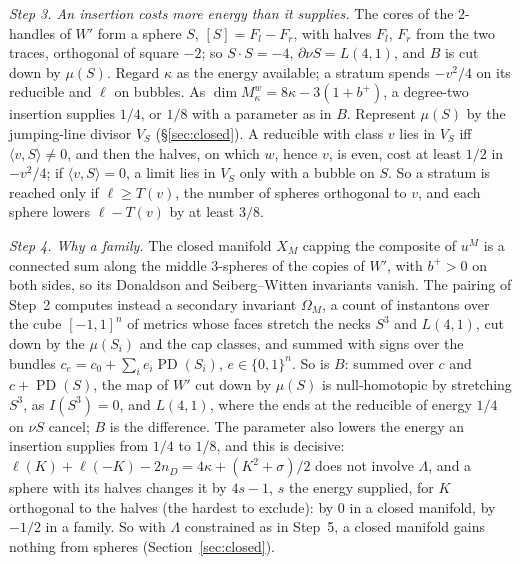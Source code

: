 \documentclass[10pt]{amsart}
\numberwithin{equation}{section}
\theoremstyle{compact}
\newcommand{\PD}{\operatorname{PD}}
\newcommand{\step}[1]{\par\noindent\textit{#1}\enspace}
\begin{document}
\step{Step 3. An insertion costs more energy than it supplies.}
The cores of the $2$-handles of $W'$ form a sphere $S$, $[S]=F_l-F_r$,
with halves $F_l$, $F_r$ from the two traces, orthogonal of square $-2$; so
$S\cdot S=-4$, $\partial\nu S=L(4,1)$, and $B$ is cut down by $\mu(S)$. Regard
$\kappa$ as the energy available; a stratum spends $-v^2/4$ on its
reducible and $\ell$ on bubbles. As
$\dim M^w_\kappa=8\kappa-3(1+b^+)$, a degree-two insertion supplies $1/4$, or
$1/8$ with a parameter as in $B$. Represent $\mu(S)$ by the
jumping-line divisor $V_S$ (\S\ref{sec:closed}). A reducible with class
$v$ lies in $V_S$ iff $\langle v,S\rangle\neq0$, and then the halves,
on which $w$, hence $v$, is even, cost at least $1/2$ in $-v^2/4$; if
$\langle v,S\rangle=0$, a limit lies in $V_S$ only with a bubble on $S$. So a
stratum is reached only if $\ell\ge T(v)$, the number of spheres orthogonal
to $v$, and each sphere lowers $\ell-T(v)$ by at least
$3/8$.

\step{Step 4. Why a family.}
The closed manifold $X_M$ capping the composite of $u^M$ is a
connected sum along the middle $3$-spheres of the copies of $W'$, with
$b^+>0$ on both sides, so its Donaldson and Seiberg--Witten invariants vanish.
The pairing of Step~2 computes instead a secondary invariant $\Omega_M$, a
count of instantons over the cube $[-1,1]^n$ of metrics whose faces stretch the necks $S^3$
and $L(4,1)$, cut down by the $\mu(S_i)$ and the cap classes, and summed with
signs over the bundles $c_e=c_0+\sum_ie_i\PD(S_i)$, $e\in\{0,1\}^n$. So is $B$:
summed over $c$ and $c+\PD(S)$, the map of $W'$ cut down by $\mu(S)$ is
null-homotopic by stretching $S^3$, as $I(S^3)=0$, and $L(4,1)$, where the
ends at the reducible of energy $1/4$ on $\nu S$ cancel; $B$ is the
difference. The
parameter also lowers the energy an insertion supplies from $1/4$ to
$1/8$, and this is decisive: $\ell(K)+\ell(-K)-2n_D=4\kappa+(K^2+\sigma)/2$ does not involve $\Lambda$, and a sphere with its halves changes
it by $4s-1$, $s$ the energy supplied, for $K$ orthogonal to the halves (the
hardest to exclude): by $0$ in a closed manifold, by $-1/2$ in a family. So with
$\Lambda$ constrained as in Step~5, a closed manifold gains nothing from
spheres (Section~\ref{sec:closed}).
\end{document}
